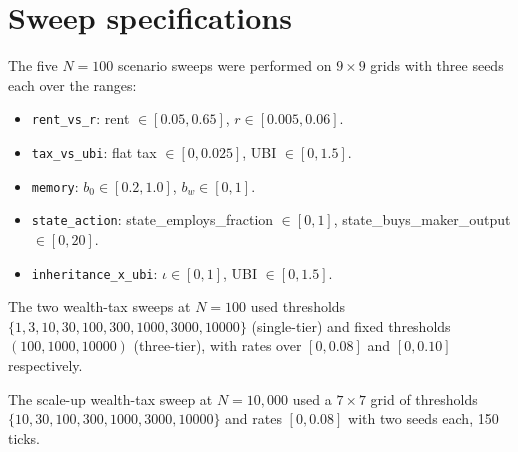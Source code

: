 \documentclass[11pt]{article}
\begin{document}
\section{Sweep specifications}
\label{app:sweeps}

The five $N=100$ scenario sweeps were performed on $9\times 9$ grids
with three seeds each over the ranges:

\begin{itemize}
\item \texttt{rent\_vs\_r}: rent $\in [0.05, 0.65]$, $r \in [0.005, 0.06]$.
\item \texttt{tax\_vs\_ubi}: flat tax $\in [0, 0.025]$, UBI $\in [0, 1.5]$.
\item \texttt{memory}: $b_0 \in [0.2, 1.0]$, $b_w \in [0, 1]$.
\item \texttt{state\_action}: state\_employs\_fraction $\in [0, 1]$,
state\_buys\_maker\_output $\in [0, 20]$.
\item \texttt{inheritance\_x\_ubi}: $\iota \in [0, 1]$, UBI $\in [0, 1.5]$.
\end{itemize}

The two wealth-tax sweeps at $N=100$ used thresholds
$\{1, 3, 10, 30, 100, 300, 1000, 3000, 10000\}$ (single-tier) and
fixed thresholds $(100, 1000, 10000)$ (three-tier), with rates over
$[0, 0.08]$ and $[0, 0.10]$ respectively.

The scale-up wealth-tax sweep at $N=10{,}000$ used a $7\times 7$ grid
of thresholds $\{10, 30, 100, 300, 1000, 3000, 10000\}$ and rates
$[0, 0.08]$ with two seeds each, 150 ticks.
\end{document}
